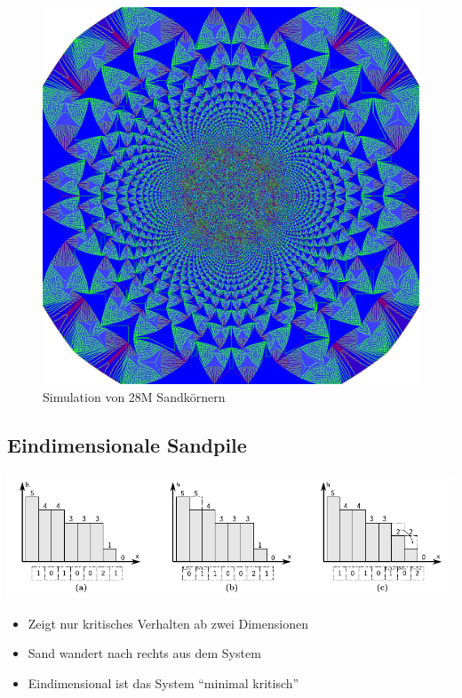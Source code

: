 \documentclass{beamer}
\begin{document}
\begin{frame}{\insertsection}{\insertsubsection}
    \begin{figure}[p]
        \centering
        \includegraphics[scale=0.16]{Backtang2.png}
        \caption{Simulation von 28M Sandkörnern}
    \end{figure}
\end{frame}

\subsection{Eindimensionale Sandpile}
\begin{frame}[fragile]{\insertsection}{\insertsubsection}
    \includegraphics[scale=0.5]{oned.png}
    \begin{itemize}
        \item Zeigt nur kritisches Verhalten ab zwei Dimensionen
        \item Sand wandert nach rechts aus dem System
        \item Eindimensional ist das System ``minimal kritisch''
    \end{itemize}
\end{frame}
\end{document}
